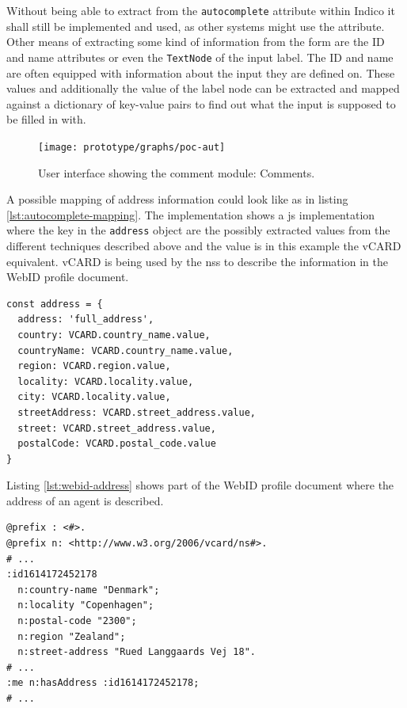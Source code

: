 Without being able to extract from the \texttt{autocomplete} attribute within Indico it shall still be implemented and used, as other systems might use the attribute. Other means of extracting some kind of information from the form are the ID and name attributes or even the \texttt{TextNode} of the input label. The ID and name are often equipped with information about the input they are defined on. These values and additionally the value of the label node can be extracted and mapped against a dictionary of key-value pairs to find out what the input is supposed to be filled in with.

\begin{figure}[ht!]
    \centering
    \texttt{[image: prototype/graphs/poc-aut]}
    \caption{User interface showing the comment module: Comments.}
    \label{fig:poc-autocomplete-conference-registration-submitted}
\end{figure}

A possible mapping of address information could look like as in listing \ref{lst:autocomplete-mapping}. The implementation shows a \gls{js} implementation where the key in the \texttt{address} object are the possibly extracted values from the different techniques described above and the value is in this example the vCARD \cite{vcard-spec} equivalent. vCARD is being used by the \gls{nss} to describe the information in the WebID profile document.

\begin{lstlisting}[language=Other,columns=fullflexible, caption={Dictionary to map extracted values with predicates from Turtle resource}, label={lst:autocomplete-mapping}]
const address = {
  address: 'full_address',
  country: VCARD.country_name.value,
  countryName: VCARD.country_name.value,
  region: VCARD.region.value,
  locality: VCARD.locality.value,
  city: VCARD.locality.value,
  streetAddress: VCARD.street_address.value,
  street: VCARD.street_address.value,
  postalCode: VCARD.postal_code.value
}
\end{lstlisting}

Listing \ref{lst:webid-address} shows part of the WebID profile document where the address of an agent is described.

\begin{lstlisting}[language=Other,columns=fullflexible, caption={Extraction from WebID profile document showing address.}, label={lst:webid-address}]
@prefix : <#>.
@prefix n: <http://www.w3.org/2006/vcard/ns#>.
# ...
:id1614172452178
  n:country-name "Denmark";
  n:locality "Copenhagen";
  n:postal-code "2300";
  n:region "Zealand";
  n:street-address "Rued Langgaards Vej 18". 
# ...
:me n:hasAddress :id1614172452178;
# ...
\end{lstlisting}

